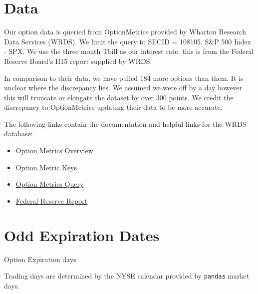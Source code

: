 \begin{appendix}


\section{Data}\label{app:data}

Our option data is queried from OptionMetrics provided by Wharton Research Data Services (WRDS). We limit the query to SECID = 108105, S\&P 500 Index - SPX. We use the three month Tbill as our interest rate, this is from the Federal Reserve Board's H15 report supplied by WRDS. 

In comparison to their data, we have pulled 184 more options than them. It is unclear where the discrepancy lies. We assumed we were off by a day however this will truncate or elongate the dataset by over 300 points. We credit the discrepancy to OptionMetrics updating their data to be more accurate. 

The following links contain the documentation and helpful links for the WRDS database: 
\begin{itemize}
\item \href{https://wrds-www.wharton.upenn.edu/pages/support/manuals-and-overviews/optionmetrics/wrds-overview-optionmetrics/}{Option Metrics Overview} 
\item \href{https://wrds-www.wharton.upenn.edu/data-dictionary/optionm_all/opprcd2023/ }{Option Metric Keys}
\item \href{https://wrds-www.wharton.upenn.edu/pages/get-data/optionmetrics/ivy-db-us/options/option-prices/}{Option Metrics Query} 
\item \href{https://wrds-www.wharton.upenn.edu/data-dictionary/frb_all/rates_daily/}{Federal Reserve Report} 
\end{itemize}





\section{Odd Expiration Dates}\label{app:oddExpDates}

\vspace{20pt}
\begin{table}[H]
  \centering
  \caption{Option Expiration days}
  
  \caption*{Trading days are determined by the NYSE calendar provided by \texttt{pandas} market days. }
  \label{table:T2days}
\end{table}


\end{appendix}
